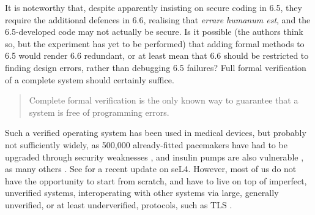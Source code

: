 \documentclass{llncs}
\begin{document}
It is noteworthy that, despite apparently insisting on secure coding in 6.5, they require the additional defences in 6.6, realising that \emph{errare humanum est}, and the 6.5-developed code may not actually be secure.  Is it possible (the authors think so, but the experiment has yet to be performed) that adding formal methods to 6.5 would render 6.6 %
 redundant, or at least mean that 6.6 should be restricted to finding design errors, rather than debugging 6.5 failures?
Full formal verification of a complete system should certainly suffice.
\begin{quote}
Complete formal verification is the only known way
to guarantee that a system is free of programming
errors. \cite[describing seL4: a verified operating system]{Kleinetal2009a}
\end{quote}
Such a verified operating system has been used in medical devices, but probably not sufficiently widely, as 500,000 already-fitted pacemakers have had to be upgraded through security weaknesses \cite{Guardian2017g}, and insulin pumps are also vulnerable \cite{Newman2019k}, as many others \cite{EvansLoftus2019a,FDA2020a}. See \cite{Heiser2019a} for a recent update on seL4.  However, most of us do not have the opportunity to start from scratch, and have to live on top of imperfect, unverified systems, interoperating with other systems via large, generally unverified, or at least underverified, protocols, such as TLS \cite{Rescorla2018a}. 
\iffalse
\end{document}
